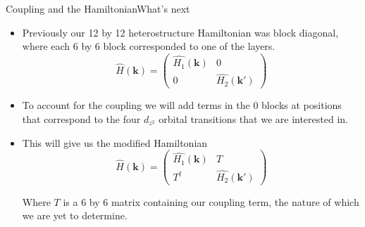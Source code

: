 \documentclass[9pt]{beamer}
\begin{document}
\begin{frame}{Coupling and the Hamiltonian}{What's next}
  \begin{itemize}
    \item{Previously our 12 by 12 heterostructure Hamiltonian was block diagonal, where each 6 by 6 block corresponded to one of the layers.
      \begin{equation}
        \hat{H}(\boldsymbol{k})=\left(\begin{array}{cc}
          \hat{H_1}(\boldsymbol{k}) & 0\\
          0 & \hat{H_2}(\boldsymbol{k'})
        \end{array}\right)
      \end{equation}
      }

    \item To account for the coupling we will add terms in the 0 blocks at positions that correspond to the four $d_{z^2}$ orbital transitions that we are interested in.

    \item{This will give us the modified Hamiltonian
      \begin{equation}
        \hat{H}(\boldsymbol{k})=\left(\begin{array}{cc}
          \hat{H_1}(\boldsymbol{k}) & T\\
          T^{\dagger} & \hat{H_2}(\boldsymbol{k'})
        \end{array}\right)
      \end{equation}

      Where $T$ is a 6 by 6 matrix containing our coupling term, the nature of which we are yet to determine.
      }
  \end{itemize}
\end{frame}
\end{document}
